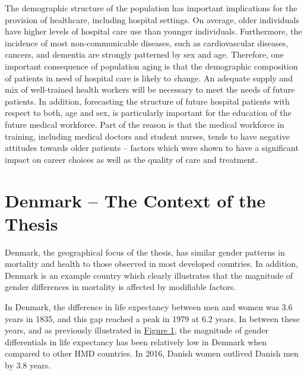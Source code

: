 The demographic structure of the population has important implications 
for the provision of healthcare, including hospital settings.\citep{christensen2009ageing,
beard2015towards} On average, older individuals have higher levels 
of hospital care use than younger individuals.\citep{pallin2014us} 
Furthermore, the incidence of most non-communicable diseases, such 
as cardiovascular diseases,\citep{leening2014sex} cancers,\citep{campisi2013aging} 
and dementia\citep{rasmussen2018absolute} are strongly patterned by 
sex and age. Therefore, one important consequence of population 
aging is that the demographic composition of patients in need of 
hospital care is likely to change. An adequate supply and mix 
of well-trained health workers will be necessary to meet the needs 
of future patients.\citep{darzi2016global} In addition, forecasting 
the structure of future hospital patients with respect to both, age 
and sex, is particularly important for the education of the future 
medical workforce.\citep{meiboom2015medical,samra2015medical,samra2017factors} 
Part of the reason is that the medical workforce in training, including 
medical doctors and student nurses, tends to have negative attitudes 
towards older patients -- factors which were shown to have a significant 
impact on career choices as well as the quality of care and treatment.\citep{hughes2008medical,
samra2015medical,kusumastuti2017contact,fisher2018pejorative} \\




\section{Denmark -- The Context of the Thesis}

Denmark, the geographical focus of the thesis, has similar gender 
patterns in mortality and health to those observed in most developed 
countries.\citep{human2005university,bronnum2005health,van2013gender,
jeune2008trends} In addition, Denmark is an example country which 
clearly illustrates that the magnitude of gender differences in 
mortality is affected by modifiable factors.

In Denmark, the difference in life expectancy between men and women 
was 3.6 years in 1835, and this gap reached a peak in 1979 at 6.2 
years.\citep{human2005university} In between these years, and as 
previously illustrated in \hyperref[ch1:fig1]{Figure 1}, the magnitude 
of gender differentials in life expectancy has been relatively low in 
Denmark when compared to other HMD countries. In 2016, Danish women 
outlived Danish men by 3.8 years. 

